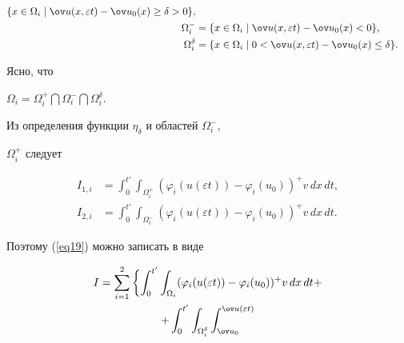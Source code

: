 \begin{pf}
\begin{align*}
\{{ x \in \Omega_{i} \mid \ov u (x, \varepsilon t)


- \ov u_{0}(x) \geq \delta > 0}\}, \\


%


\Omega_{i}^{-}&=


\{{ x \in \Omega_{i} \mid \ov u (x, \varepsilon t)


- \ov u_{0}(x) < 0}\}, \\


%


\Omega_{i}^{\delta}&=


\{{ x \in \Omega_{i} \mid 0 < \ov u (x, \varepsilon t)


- \ov u_{0}(x) \leq \delta}\}. 


\end{align*}


Ясно, что


$\Omega_{i}=\Omega_{i}^+\bigcap\Omega_{i}^-\bigcap \Omega_{i}^{\delta}$.


Из определения функции $\eta_{\delta}$ и областей $\Omega_{i}^{-}$,


$\Omega_{i}^{+}$ следует


\begin{align*}


I_{1,i}&=\int_{0}^{{t}'} \int_{\Omega_{i}^{+}}(\varphi_i(u(\varepsilon t))- 


\varphi_{i} (u_{0}))^{+} v\, dx\, dt, \\


%


I_{2,i}&=\int_{0}^{{t}'}\int_{\Omega_{i}^{-}}(\varphi_i(u(\varepsilon t))- 


\varphi_{i} (u_{0}))^{+} v\, dx\, dt.


\end{align*}


Поэтому (\ref{eq19}) можно записать в виде 


\begin{multline*} 


I=\sum_{i=1}^{2} \bigg\{{ 


\int_{0}^{{t}'} \int_{\Omega_{i}} ({\varphi_{i}(u(\varepsilon t))-


\varphi_{i} (u_{0})} )^{+} v\, d x\, d t+} \\


%


{+\int_{0}^{{t}'} \int_{\Omega_{i}^{\delta}}


\int_{\ov u_{0}}^{\ov u(\varepsilon t)} 


}
\end{multline*}
\end{pf}
